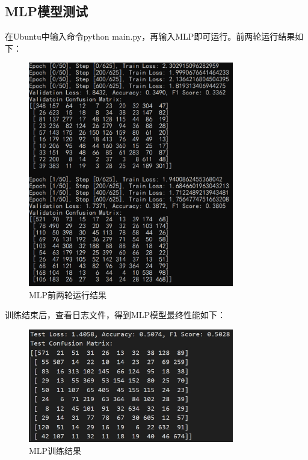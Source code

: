 \documentclass[UTF8]{ctexart}
\begin{document}
\subsection{MLP模型测试}
在Ubuntu中输入命令python main.py，再输入MLP即可运行。前两轮运行结果如下：
\begin{figure}[h]
    \centering
    \includegraphics[width=0.8\textwidth]{MLP_run.png}
    \caption*{MLP前两轮运行结果}
\end{figure}

\newpage
训练结束后，查看日志文件，得到MLP模型最终性能如下：
\begin{figure}[h]
    \centering
    \includegraphics[width=0.8\textwidth]{MLP_res.png}
    \caption*{MLP训练结果}
\end{figure}
\end{document}
